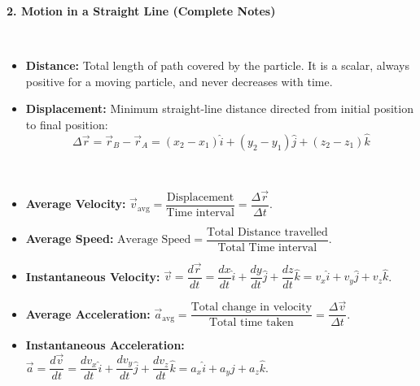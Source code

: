 \documentclass[11pt,a4paper]{article}
\begin{document}
\vspace{10pt}

\begin{tcolorbox}[chapterbanner]
  {\Large \textbf{\textsf{2. Motion in a Straight Line (Complete Notes)}}}
\end{tcolorbox}
\vspace{4pt}

\noindent{\large\textbf{\textsf{\textcolor{primaryDark}{2.1 Distance versus Displacement}}}}\\[3pt]
\begin{itemize}[leftmargin=14pt,itemsep=1pt]
  \item \textbf{Distance:} Total length of path covered by the particle. It is a scalar, always positive for a moving particle, and never decreases with time.
  \item \textbf{Displacement:} Minimum straight-line distance directed from initial position to final position:
  \[
    \Delta \vec{r} = \vec{r}_B - \vec{r}_A = (x_2 - x_1)\hat{i} + (y_2 - y_1)\hat{j} + (z_2 - z_1)\hat{k}
  \]
\end{itemize}

\vspace{5pt}
\noindent{\large\textbf{\textsf{\textcolor{primaryDark}{2.2 Velocity and Acceleration Definitions}}}}\\[3pt]
\begin{itemize}[leftmargin=14pt,itemsep=1pt]
  \item \textbf{Average Velocity:} $\vec{v}_{\text{avg}} = \dfrac{\text{Displacement}}{\text{Time interval}} = \dfrac{\Delta \vec{r}}{\Delta t}$.
  \item \textbf{Average Speed:} $\text{Average Speed} = \dfrac{\text{Total Distance travelled}}{\text{Total Time interval}}$.
  \item \textbf{Instantaneous Velocity:} $\vec{v} = \dfrac{d\vec{r}}{dt} = \dfrac{dx}{dt}\hat{i} + \dfrac{dy}{dt}\hat{j} + \dfrac{dz}{dt}\hat{k} = v_x \hat{i} + v_y \hat{j} + v_z \hat{k}$.
  \item \textbf{Average Acceleration:} $\vec{a}_{\text{avg}} = \dfrac{\text{Total change in velocity}}{\text{Total time taken}} = \dfrac{\Delta \vec{v}}{\Delta t}$.
  \item \textbf{Instantaneous Acceleration:} $\vec{a} = \dfrac{d\vec{v}}{dt} = \dfrac{dv_x}{dt}\hat{i} + \dfrac{dv_y}{dt}\hat{j} + \dfrac{dv_z}{dt}\hat{k} = a_x \hat{i} + a_y \hat{j} + a_z \hat{k}$.
\end{itemize}
\end{document}
